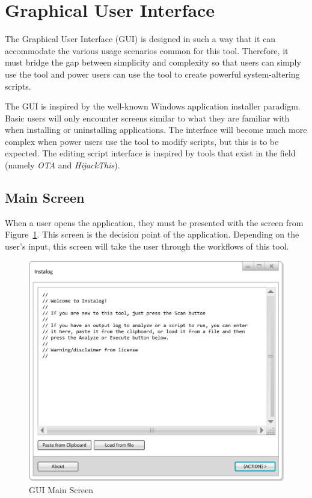 \section{Graphical User Interface}
The Graphical User Interface (GUI) is designed in such a way that it can
accommodate the various usage scenarios common for this tool.  Therefore, it
must bridge the gap between simplicity and complexity so that users can simply
use the tool and power users can use the tool to create powerful system-altering
scripts.

The GUI is inspired by the well-known Windows application installer paradigm. 
Basic users will only encounter screens similar to what they are familiar with
when installing or uninstalling applications.  The interface will become much
more complex when power users use the tool to modify scripts, but this is to be
expected.  The editing script interface is inspired by tools that exist in the
field (namely \textit{OTA} and \textit{HijackThis}).

\subsection{Main Screen}
When a user opens the application, they must be presented with the screen from
Figure~\ref{fig:gui_main}.  This screen is the decision point of the
application.  Depending on the user's input, this screen will take the user
through the workflows of this tool.

\begin{figure}[h]
  	\centering
	\includegraphics{figures/gui/Main.png}
  	\caption{GUI Main Screen}
  	\label{fig:gui_main}
\end{figure}

